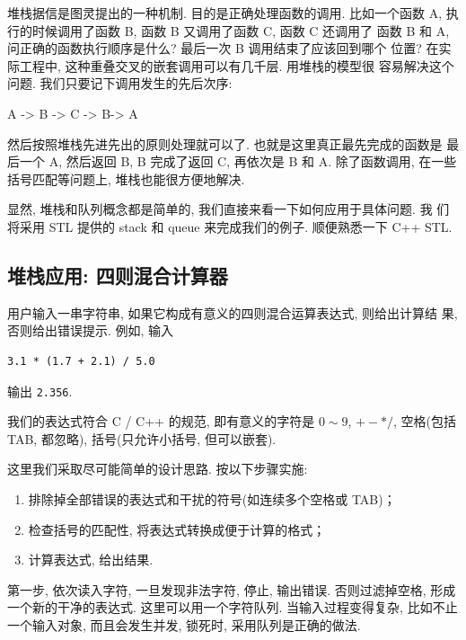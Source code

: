 \documentclass[a4paper]{ctexart}
\theoremstyle{definition}
\theoremstyle{definition}
\begin{document}
堆栈据信是图灵提出的一种机制. 目的是正确处理函数的调用. 比如一个函数
A, 执行的时候调用了函数 B, 函数 B 又调用了函数 C, 函数 C 还调用了 函数
B 和 A, 问正确的函数执行顺序是什么? 最后一次 B 调用结束了应该回到哪个
位置? 在实际工程中, 这种重叠交叉的嵌套调用可以有几千层. 用堆栈的模型很
容易解决这个问题. 我们只要记下调用发生的先后次序:

\begin{center}
A -> B -> C -> B-> A
\end{center}

然后按照堆栈先进先出的原则处理就可以了. 也就是这里真正最先完成的函数是
最后一个 A, 然后返回 B, B 完成了返回 C, 再依次是 B 和 A. 除了函数调用,
在一些括号匹配等问题上, 堆栈也能很方便地解决.

显然, 堆栈和队列概念都是简单的, 我们直接来看一下如何应用于具体问题. 我
们将采用 STL 提供的 stack 和 queue 来完成我们的例子. 顺便熟悉一下 C++
STL.

\subsection{堆栈应用: 四则混合计算器}

用户输入一串字符串, 如果它构成有意义的四则混合运算表达式, 则给出计算结
果, 否则给出错误提示. 例如, 输入
\begin{verbatim}
3.1 * (1.7 + 2.1) / 5.0
\end{verbatim}
输出 \verb|2.356|. 

我们的表达式符合 C / C++ 的规范, 即有意义的字符是 $0 \sim 9$, $+ - *
/$, 空格(包括 TAB, 都忽略), 括号(只允许小括号, 但可以嵌套).

这里我们采取尽可能简单的设计思路. 按以下步骤实施:

\begin{enumerate}
\item 排除掉全部错误的表达式和干扰的符号(如连续多个空格或 TAB)；
\item 检查括号的匹配性, 将表达式转换成便于计算的格式；
\item 计算表达式, 给出结果.
\end{enumerate}

第一步, 依次读入字符, 一旦发现非法字符, 停止, 输出错误. 否则过滤掉空格,
形成一个新的干净的表达式. 这里可以用一个字符队列. 当输入过程变得复杂,
比如不止一个输入对象, 而且会发生并发, 锁死时, 采用队列是正确的做法.
\end{document}
